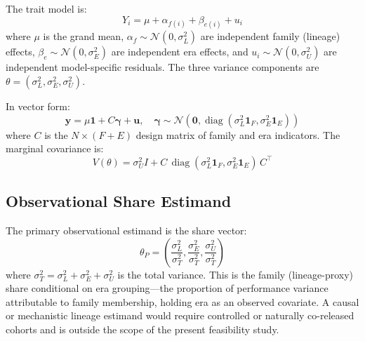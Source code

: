 \documentclass{ieeeaccess}
\theoremstyle{definition}
\theoremstyle{plain}
\begin{document}
The trait model is:
\begin{equation}
Y_i = \mu + \alpha_{f(i)} + \beta_{e(i)} + u_i
\label{eq:model}
\end{equation}
where $\mu$ is the grand mean, $\alpha_f \sim \mathcal{N}(0, \sigma^2_L)$ are independent family (lineage) effects, $\beta_e \sim \mathcal{N}(0, \sigma^2_E)$ are independent era effects, and $u_i \sim \mathcal{N}(0, \sigma^2_U)$ are independent model-specific residuals. The three variance components are $\theta = (\sigma^2_L, \sigma^2_E, \sigma^2_U)$.

In vector form:
\begin{equation}
\mathbf{y} = \mu \mathbf{1} + C \boldsymbol{\gamma} + \mathbf{u}, \quad \boldsymbol{\gamma} \sim \mathcal{N}(\mathbf{0}, \operatorname{diag}(\sigma^2_L \mathbf{1}_F, \sigma^2_E \mathbf{1}_E))
\label{eq:vector}
\end{equation}
where $C$ is the $N \times (F + E)$ design matrix of family and era indicators. The marginal covariance is:
\begin{equation}
V(\theta) = \sigma^2_U I + C \, \operatorname{diag}(\sigma^2_L \mathbf{1}_F, \sigma^2_E \mathbf{1}_E) \, C^\top
\label{eq:cov}
\end{equation}

\subsection{Observational Share Estimand}
The primary observational estimand is the share vector:
\begin{equation}
\theta_P = \left( \frac{\sigma^2_L}{\sigma^2_T}, \frac{\sigma^2_E}{\sigma^2_T}, \frac{\sigma^2_U}{\sigma^2_T} \right)
\label{eq:thetaP}
\end{equation}
where $\sigma^2_T = \sigma^2_L + \sigma^2_E + \sigma^2_U$ is the total variance. This is the family (lineage-proxy) share conditional on era grouping---the proportion of performance variance attributable to family membership, holding era as an observed covariate. A causal or mechanistic lineage estimand would require controlled or naturally co-released cohorts and is outside the scope of the present feasibility study.
\end{document}
